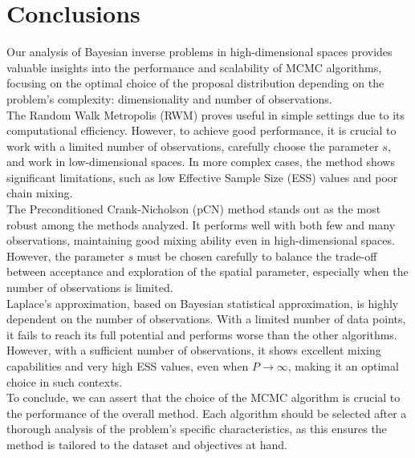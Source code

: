\documentclass{article}
\begin{document}
\section*{Conclusions}

Our analysis of Bayesian inverse problems in high-dimensional spaces provides valuable insights into the performance and scalability of MCMC algorithms, 
focusing on the optimal choice of the proposal distribution depending on the problem's complexity: dimensionality and number of observations.\\
The Random Walk Metropolis (RWM) proves useful in simple settings due to its computational efficiency. However, to achieve good performance, 
it is crucial to work with a limited number of observations, carefully choose the parameter \( s \), and work in low-dimensional spaces. 
In more complex cases, the method shows significant limitations, such as low Effective Sample Size (ESS) values and poor chain mixing.\\
The Preconditioned Crank-Nicholson (pCN) method stands out as the most robust among the methods analyzed. It performs well with both few and many observations, 
maintaining good mixing ability even in high-dimensional spaces. However, the parameter \( s \) must be chosen carefully to balance the trade-off 
between acceptance and exploration of the spatial parameter, especially when the number of observations is limited.\\
Laplace's approximation, based on Bayesian statistical approximation, is highly dependent on the number of observations. With a limited number of data points, 
it fails to reach its full potential and performs worse than the other algorithms. However, with a sufficient number of observations, 
it shows excellent mixing capabilities and very high ESS values, even when $P \rightarrow \infty$, making it an optimal choice in such contexts.\\
To conclude, we can assert that the choice of the MCMC algorithm is crucial to the performance of the overall method. 
Each algorithm should be selected after a thorough analysis of the problem's specific characteristics, as this ensures 
the method is tailored to the dataset and objectives at hand.
\end{document}
